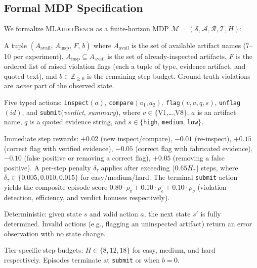 \documentclass{article}
\begin{document}
\subsection{Formal MDP Specification}
\label{sec:mdp}

We formalize \textsc{MLAuditBench} as a finite-horizon MDP $\mathcal{M} = (\mathcal{S}, \mathcal{A}, \mathcal{R}, \mathcal{T}, H)$:

\begin{description}[leftmargin=1.5em, labelindent=0em]
      \item[\textbf{State} $s \in \mathcal{S}$:]
            A tuple $(A_\text{avail},\, A_\text{insp},\, F,\, b)$ where
            $A_\text{avail}$ is the set of available artifact names (7--10 per experiment),
            $A_\text{insp} \subseteq A_\text{avail}$ is the set of already-inspected artifacts,
            $F$ is the ordered list of raised violation flags (each a tuple of type, evidence artifact, and quoted text),
            and $b \in \mathbb{Z}_{\geq 0}$ is the remaining step budget.
            Ground-truth violations are \emph{never} part of the observed state.

      \item[\textbf{Action} $a \in \mathcal{A}$:]
            Five typed actions: \texttt{inspect}$(a)$, \texttt{compare}$(a_1, a_2)$,
            \texttt{flag}$(v, a, q, s)$, \texttt{unflag}$(id)$, and
            \texttt{submit}(\textit{verdict}, \textit{summary}),
            where $v \in \{$V1,\ldots,V8$\}$, $a$ is an artifact name,
            $q$ is a quoted evidence string, and $s \in \{$\texttt{high}, \texttt{medium}, \texttt{low}$\}$.

      \item[\textbf{Reward} $\mathcal{R}$:]
            Immediate step rewards: $+0.02$ (new inspect/compare), $-0.01$ (re-inspect),
            $+0.15$ (correct flag with verified evidence), $-0.05$ (correct flag with fabricated evidence),
            $-0.10$ (false positive or removing a correct flag), $+0.05$ (removing a false positive).
            A per-step penalty $\delta_\tau$ applies after exceeding $\lfloor 0.65 H_\tau \rfloor$ steps,
            where $\delta_\tau \in \{0.005, 0.010, 0.015\}$ for easy/medium/hard.
            The terminal \texttt{submit} action yields the composite episode score
            $0.80 \cdot \rho_v + 0.10 \cdot \rho_e + 0.10 \cdot \rho_\nu$
            (violation detection, efficiency, and verdict bonuses respectively).

      \item[\textbf{Transition} $\mathcal{T}$:]
            Deterministic: given state $s$ and valid action $a$, the next state $s'$ is fully determined.
            Invalid actions (e.g., flagging an uninspected artifact) return an error observation with no state change.

      \item[\textbf{Horizon} $H$:]
            Tier-specific step budgets: $H \in \{8, 12, 18\}$ for easy, medium, and hard respectively.
            Episodes terminate at \texttt{submit} or when $b = 0$.
\end{description}
\end{document}
